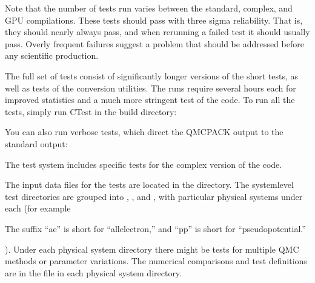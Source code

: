 \documentclass[letterpaper,10pt,english]{sphinxmanual}
\begin{document}
Note that the number of tests run varies between the
standard, complex, and GPU compilations. These tests should pass with three sigma reliability. That is, they should nearly always pass, and when rerunning a failed test it should usually pass. Overly frequent failures suggest a problem that should be addressed before any scientific production.

The  full set of tests consist of significantly longer versions of the short
tests, as well as tests of the conversion utilities. The runs require
several hours each for improved statistics and a much more
stringent test of the code. To run all the tests, simply run CTest in the build
directory:

\begin{sphinxVerbatim}[commandchars=\\\{\}]
             
\end{sphinxVerbatim}

You can also run verbose tests, which direct the QMCPACK
output to the standard output:

\begin{sphinxVerbatim}[commandchars=\\\{\}]
      
\end{sphinxVerbatim}

The test system includes specific tests for the complex version of the code.

The input data files for the tests are located in the  directory.
The system\sphinxhyphen{}level test directories are grouped into , , and , with particular physical systems under each (for example  %
\begin{footnote}[1]\sphinxAtStartFootnote
The suffix “ae” is short for “all\sphinxhyphen{}electron,” and “pp” is short for “pseudopotential.”
%
\end{footnote} ).
Under each physical system directory there might be tests for multiple QMC methods or parameter variations.
The numerical comparisons and test definitions are in the  file in each physical system directory.
\end{document}
